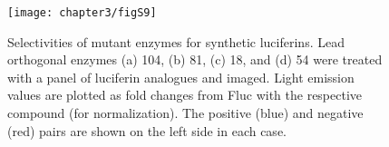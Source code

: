 \par
\begin{figure}[htb]
\texttt{[image: chapter3/figS9]}
\centering
\caption[Selectivities of mutant enzymes for synthetic luciferins]{Selectivities of mutant enzymes for synthetic luciferins. Lead orthogonal enzymes (a) 104, (b) 81, (c) 18, and (d) 54 were treated with a panel of luciferin analogues and imaged. Light emission values are plotted as fold changes from Fluc with the respective compound (for normalization). The positive (blue) and negative (red) pairs are shown on the left side in each case.}
  \label{fig:S9}
\end{figure}

